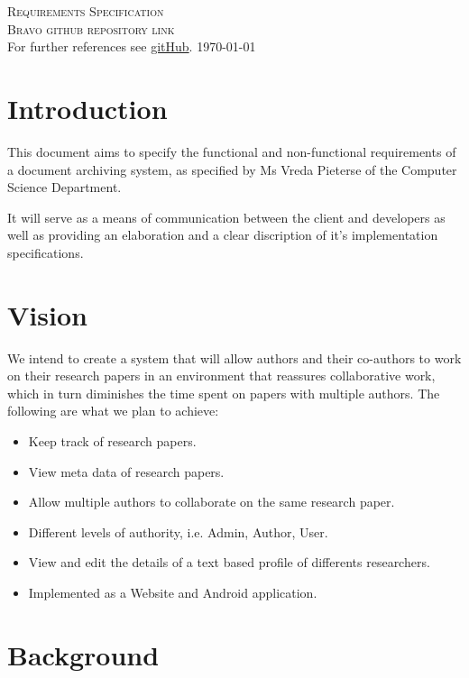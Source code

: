 \documentclass[a4paper,12pt]{report}
\begin{document}
\renewcommand{\thesection}{\arabic{section}}
\newpage
\begin{center}
\textsc{\LARGE Requirements Specification}\\[1.5cm]
\textsc{\Large Bravo github repository link}\\[0.5cm]
For further references see \href{https://github.com/ish1993/Bravo}{gitHub}.
\today
\end{center}


\newpage
\section{Introduction}

This document aims to specify the functional and non-functional requirements of a document archiving system, as specified by Ms Vreda Pieterse of the Computer Science Department.

It will serve as a means of communication between the client and developers as well as providing an elaboration and a clear discription of it's implementation specifications.

\section{Vision}

We intend to create a system that will allow authors and their co-authors to work on their research papers in an environment that reassures collaborative work, which in turn diminishes the time spent on papers with multiple authors. The following are what we plan to achieve: 

\begin{itemize}
	\item Keep track of research papers.
	\item View meta data of research papers. 
	\item Allow multiple authors to collaborate on the same research paper. 
	\item Different levels of authority, i.e. Admin, Author, User.
	\item View and edit the details of a text based profile of differents researchers. 
	\item Implemented as a Website and Android application.
\end{itemize} 

\section{Background}
\end{document}
